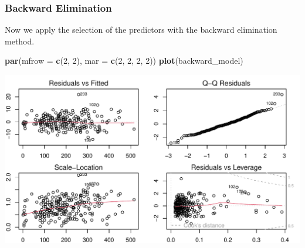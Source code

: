 \documentclass[
]{article}
\newenvironment{Shaded}{\begin{snugshade}}{\end{snugshade}}
\newcommand{\AttributeTok}[1]{\textcolor[rgb]{0.13,0.29,0.53}{#1}}
\newcommand{\DecValTok}[1]{\textcolor[rgb]{0.00,0.00,0.81}{#1}}
\newcommand{\FunctionTok}[1]{\textcolor[rgb]{0.13,0.29,0.53}{\textbf{#1}}}
\newcommand{\NormalTok}[1]{#1}
\newcommand{\SpecialCharTok}[1]{\textcolor[rgb]{0.81,0.36,0.00}{\textbf{#1}}}
\newcommand{\StringTok}[1]{\textcolor[rgb]{0.31,0.60,0.02}{#1}}
\begin{document}
\hypertarget{backward-elimination}{%
\subsubsection{Backward Elimination}\label{backward-elimination}}

Now we apply the selection of the predictors with the backward
elimination method.

\begin{Shaded}
\begin{Highlighting}[]
\FunctionTok{par}\NormalTok{(}\AttributeTok{mfrow =} \FunctionTok{c}\NormalTok{(}\DecValTok{2}\NormalTok{, }\DecValTok{2}\NormalTok{), }\AttributeTok{mar =} \FunctionTok{c}\NormalTok{(}\DecValTok{2}\NormalTok{, }\DecValTok{2}\NormalTok{, }\DecValTok{2}\NormalTok{, }\DecValTok{2}\NormalTok{))}
\FunctionTok{plot}\NormalTok{(backward\_model)}
\end{Highlighting}
\end{Shaded}

\begin{center}\includegraphics{Statistical_Learning_Final_Report_files/figure-latex/backward_elimination-1} \end{center}

\begin{Shaded}
\end{Shaded}
\end{document}
